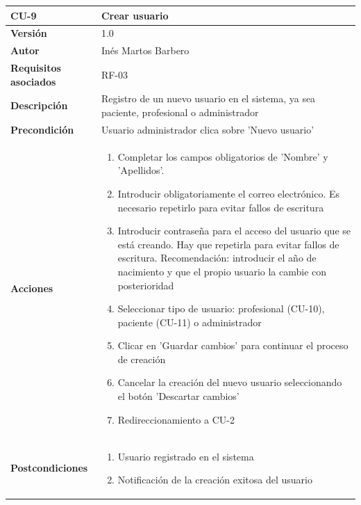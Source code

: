 \begin{table}[p]
	\centering
	\begin{tabularx}{\linewidth}{ p{} p{} }
		\toprule
		\textbf{CU-9}    & \textbf{Crear usuario}\\
		\toprule
		\textbf{Versión}              & 1.0    \\
		\textbf{Autor}                & Inés Martos Barbero \\
		\textbf{Requisitos asociados} & RF-03 \\
		\textbf{Descripción}          & Registro de un nuevo usuario en el sistema, ya sea paciente, profesional o administrador \\
		\textbf{Precondición}         & Usuario administrador clica sobre 'Nuevo usuario' \\
		\textbf{Acciones}             &
		\begin{enumerate}
			\def\labelenumi{\arabic{enumi}.}
			\tightlist
			\item Completar los campos obligatorios de 'Nombre' y 'Apellidos'.
            \item Introducir obligatoriamente el correo electrónico. Es necesario repetirlo para evitar fallos de escritura
            \item Introducir contraseña para el acceso del usuario que se está creando. Hay que repetirla para evitar fallos de escritura. Recomendación: introducir el año de nacimiento y que el propio usuario la cambie con posterioridad
            \item Seleccionar tipo de usuario: profesional (CU-10), paciente (CU-11) o administrador
            \item Clicar en 'Guardar cambios' para continuar el proceso de creación
            \item Cancelar la creación del nuevo usuario seleccionando el botón 'Descartar cambios'
            \item Redireccionamiento a CU-2
		\end{enumerate}\\
		\textbf{Postcondiciones}        & 
            \begin{enumerate}
    			\def\labelenumi{\arabic{enumi}.}
    			\tightlist
    			\item Usuario registrado en el sistema 
                \item Notificación de la creación exitosa del usuario
    		\end{enumerate}\\

\end{tabularx}
\end{table}
